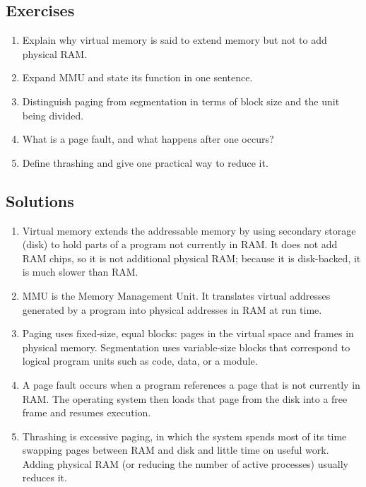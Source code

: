 \documentclass[11pt]{article}
\begin{document}
\subsection*{Exercises}
\begin{enumerate}[label=\arabic*.]
  \item Explain why virtual memory is said to extend memory but not to add
    physical RAM.
  \item Expand MMU and state its function in one sentence.
  \item Distinguish paging from segmentation in terms of block size and the
    unit being divided.
  \item What is a page fault, and what happens after one occurs?
  \item Define thrashing and give one practical way to reduce it.
\end{enumerate}

\subsection*{Solutions}
\begingroup\small
\begin{enumerate}[label=\arabic*.]
  \item Virtual memory extends the addressable memory by using secondary
    storage (disk) to hold parts of a program not currently in RAM. It does not
    add RAM chips, so it is not additional physical RAM; because it is
    disk-backed, it is much slower than RAM.
  \item MMU is the Memory Management Unit. It translates virtual addresses
    generated by a program into physical addresses in RAM at run time.
  \item Paging uses fixed-size, equal blocks: pages in the virtual space and
    frames in physical memory. Segmentation uses variable-size blocks that
    correspond to logical program units such as code, data, or a module.
  \item A page fault occurs when a program references a page that is not
    currently in RAM. The operating system then loads that page from the disk
    into a free frame and resumes execution.
  \item Thrashing is excessive paging, in which the system spends most of its
    time swapping pages between RAM and disk and little time on useful work.
    Adding physical RAM (or reducing the number of active processes) usually
    reduces it.
\end{enumerate}
\endgroup
\end{document}
